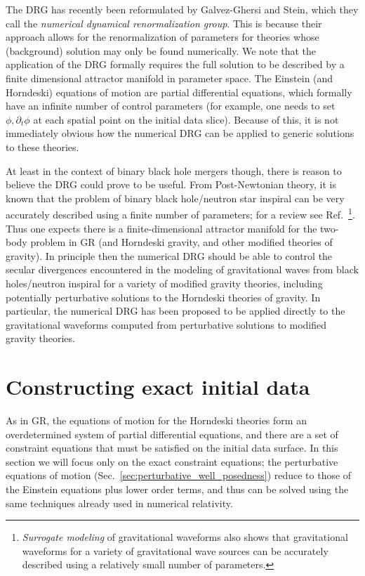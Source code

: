 \documentclass{ws-ijmpd}
\begin{document}
The DRG has recently been reformulated 
by Galvez-Ghersi and Stein\cite{GalvezGhersi:2021sxs},
which they call the \emph{numerical dynamical
renormalization group}.
This is because their approach allows for the renormalization
of parameters for theories whose (background) 
solution may only be found numerically.
We note that the application of the DRG formally requires the full
solution to be described by 
a finite dimensional attractor manifold in parameter space.
The Einstein (and Horndeski) equations of motion are partial differential
equations, which formally have an infinite number of control parameters
(for example, one needs to set $\phi,\partial_t\phi$ at each spatial point
on the initial data slice).
Because of this, it is not
immediately obvious how the numerical DRG can be applied to generic
solutions to these theories.

At least in the context of binary black hole mergers though, 
there is reason to believe the DRG could prove to be useful.
From Post-Newtonian theory, it is known
that the problem of binary black hole/neutron star inspiral
can be very accurately described using a finite number of 
parameters; for a review see 
Ref.~\footnote{\emph{Surrogate modeling} 
of gravitational waveforms 
also shows that gravitational waveforms for a variety of gravitational wave
sources can be accurately described using a relatively small 
number of parameters\cite{Tiglio:2021ysj}.}.
Thus one expects there is a finite-dimensional attractor manifold
for the two-body problem in GR (and Horndeski gravity, and other
modified theories of gravity).
In principle then the numerical DRG should 
be able to control the secular divergences
encountered in the modeling of gravitational waves from black holes/neutron
inspiral for a variety of modified gravity theories, including potentially
perturbative solutions to the Horndeski theories of gravity.
In particular,
the numerical DRG has been proposed to be applied directly to the 
gravitational waveforms
computed from perturbative solutions to 
modified gravity theories\cite{GalvezGhersi:2021sxs}.

\section{Constructing exact initial data
\label{sec:constructing_initial_data}
}

As in GR, the equations of motion for the
Horndeski theories form an overdetermined
system of partial differential equations,
and there are a set of constraint equations that must be satisfied
on the initial data surface.
In this section we will focus only on the exact constraint equations;
the perturbative equations of motion 
(Sec.~\ref{sec:perturbative_well_posedness}) reduce to those
of the Einstein equations plus lower order terms, and thus can
be solved using the same techniques already used in numerical
relativity\cite{Cook:2000vr}.
\end{document}
